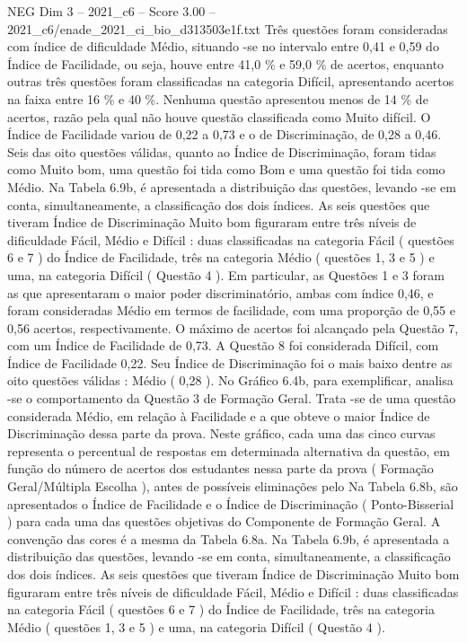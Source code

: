 \begin{textsample}{NEG Dim 3 – 2021\_c6 – Score 3.00 – 2021\_c6/enade\_2021\_ci\_bio\_d313503e1f.txt}
Três questões foram consideradas com índice de dificuldade Médio, situando -se no intervalo entre 0,41 e 0,59 do Índice de Facilidade, ou seja, houve entre 41,0 \% e 59,0 \% de acertos, enquanto outras três questões foram classificadas na categoria Difícil, apresentando acertos na faixa entre 16 \% e 40 \%.
Nenhuma questão apresentou menos de 14 \% de acertos, razão pela qual não houve questão classificada como Muito difícil.
O Índice de Facilidade variou de 0,22 a 0,73 e o de Discriminação, de 0,28 a 0,46.
Seis das oito questões válidas, quanto ao Índice de Discriminação, foram tidas como Muito bom, uma questão foi tida como Bom e uma questão foi tida como Médio.
Na Tabela 6.9b, é apresentada a distribuição das questões, levando -se em conta, simultaneamente, a classificação dos dois índices.
As seis questões que tiveram Índice de Discriminação Muito bom figuraram entre três níveis de dificuldade Fácil, Médio e Difícil : duas classificadas na categoria Fácil ( questões 6 e 7 ) do Índice de Facilidade, três na categoria Médio ( questões 1, 3 e 5 ) e uma, na categoria Difícil ( Questão 4 ).
Em particular, as Questões 1 e 3 foram as que apresentaram o maior poder discriminatório, ambas com índice 0,46, e foram consideradas Médio em termos de facilidade, com uma proporção de 0,55 e 0,56 acertos, respectivamente.
O máximo de acertos foi alcançado pela Questão 7, com um Índice de Facilidade de 0,73.
A Questão 8 foi considerada Difícil, com Índice de Facilidade 0,22.
Seu Índice de Discriminação foi o mais baixo dentre as oito questões válidas : Médio ( 0,28 ).
No Gráfico 6.4b, para exemplificar, analisa -se o comportamento da Questão 3 de Formação Geral.
Trata -se de uma questão considerada Médio, em relação à Facilidade e a que obteve o maior Índice de Discriminação dessa parte da prova.
Neste gráfico, cada uma das cinco curvas representa o percentual de respostas em determinada alternativa da questão, em função do número de acertos dos estudantes nessa parte da prova ( Formação Geral/Múltipla Escolha ), antes de possíveis eliminações pelo Na Tabela 6.8b, são apresentados o Índice de Facilidade e o Índice de Discriminação ( Ponto-Bisserial ) para cada uma das questões objetivas do Componente de Formação Geral.
A convenção das cores é a mesma da Tabela 6.8a.
Na Tabela 6.9b, é apresentada a distribuição das questões, levando -se em conta, simultaneamente, a classificação dos dois índices.
As seis questões que tiveram Índice de Discriminação Muito bom figuraram entre três níveis de dificuldade Fácil, Médio e Difícil : duas classificadas na categoria Fácil ( questões 6 e 7 ) do Índice de Facilidade, três na categoria Médio ( questões 1, 3 e 5 ) e uma, na categoria Difícil ( Questão 4 ).

\end{textsample}
